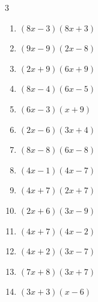 \begin{multicols}{3}
\begin{enumerate}

  \item $(8x-3)(8x+3)$


  \item $(9x-9)(2x-8)$


  \item $(2x+9)(6x+9)$


  \item $(8x-4)(6x-5)$


  \item $(6x-3)(x+9)$


  \item $(2x-6)(3x+4)$


  \item $(8x-8)(6x-8)$


  \item $(4x-1)(4x-7)$


  \item $(4x+7)(2x+7)$


  \item $(2x+6)(3x-9)$


\columnbreak %

  \item $(4x+7)(4x-2)$


  \item $(4x+2)(3x-7)$


  \item $(7x+8)(3x+7)$


  \item $(3x+3)(x-6)$



\end{enumerate}
\end{multicols}
